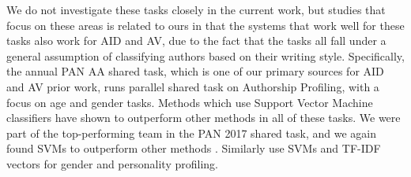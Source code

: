 We do not investigate these tasks closely in the current work, but studies that focus on these areas is related to ours in that the systems that work well for these tasks also work for AID and AV, due to the fact that the tasks all fall under a general assumption of classifying authors based on their writing style. Specifically, the annual PAN AA shared task, which is one of our primary sources for AID and AV prior work, runs parallel shared task on Authorship Profiling, with a focus on age and gender tasks. Methods which use Support Vector Machine classifiers have shown to outperform other methods in all of these tasks. We were part of the top-performing team in the PAN 2017 shared task, and we again found SVMs to outperform other methods \cite{basile2017ngram}. Similarly \citet{verhoeven2016twisty} use SVMs and TF-IDF vectors for gender and personality profiling.
